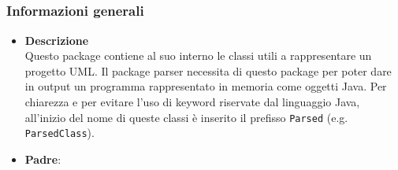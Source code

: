 \subsection{}
\label{\nogloxy{swedesigner::server::project}}
\subsubsection{Informazioni generali}
\begin{itemize}
\item \textbf{Descrizione}\\
Questo package contiene al suo interno le classi utili a rappresentare un progetto UML. Il package parser necessita di questo package per poter dare in output un programma rappresentato in memoria come oggetti Java. Per chiarezza e per evitare l'uso di keyword riservate dal linguaggio Java, all'inizio del nome di queste classi è inserito il prefisso \texttt{Parsed} (e.g. \texttt{ParsedClass}).
\item \textbf{Padre}: \hyperref[\nogloxy{swedesigner::server}]{}
\end{itemize}
